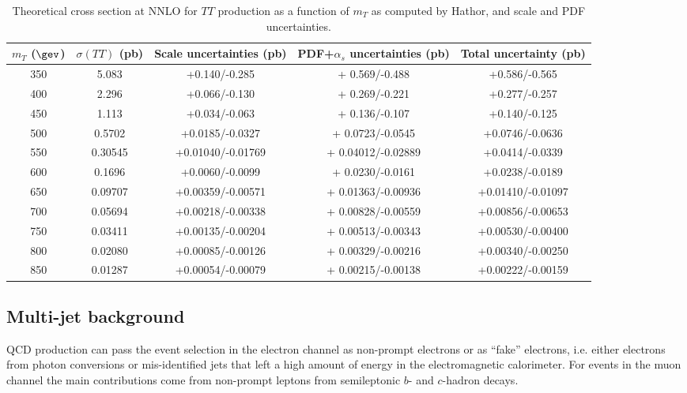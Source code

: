 \begin{table}[h!]
\begin{center}
\begin{tabular}{c c c c c}
\hline
\hline
 $m_{T}$ ($\gev$) & $\sigma(TT)$ (pb) & Scale uncertainties (pb) & PDF+$\alpha_s$ uncertainties (pb) & Total uncertainty (pb)\\
\hline
350 	&  5.083 		&  +0.140/-0.285 		&  + 0.569/-0.488 		&  +0.586/-0.565		\\
400 	&  2.296 		&  +0.066/-0.130 		&  + 0.269/-0.221 		&  +0.277/-0.257		\\
450 	&  1.113 		&  +0.034/-0.063 		&  + 0.136/-0.107 		&  +0.140/-0.125		\\
500 	&  0.5702 		&  +0.0185/-0.0327 		&  + 0.0723/-0.0545	 	&  +0.0746/-0.0636		\\
550 	&  0.30545 	&  +0.01040/-0.01769 	&  + 0.04012/-0.02889 	&  +0.0414/-0.0339		\\
600 	&  0.1696 		&  +0.0060/-0.0099 		&  + 0.0230/-0.0161	 	&  +0.0238/-0.0189		\\	
650 	&  0.09707 	&  +0.00359/-0.00571 	&  + 0.01363/-0.00936 	&  +0.01410/-0.01097	\\
700 	&  0.05694 	&  +0.00218/-0.00338 	&  + 0.00828/-0.00559 	&  +0.00856/-0.00653	\\
750 	&  0.03411 	&  +0.00135/-0.00204 	&  + 0.00513/-0.00343 	&  +0.00530/-0.00400	\\
800 	&  0.02080 	&  +0.00085/-0.00126 	&  + 0.00329/-0.00216 	&  +0.00340/-0.00250	\\
850 	&  0.01287 	&  +0.00054/-0.00079 	&  + 0.00215/-0.00138 	&  +0.00222/-0.00159 	\\
\hline
\hline
\end{tabular}
\caption{\label{tab:sigmaTT} Theoretical cross section at NNLO  for $TT$ production as a function
of $m_{T}$ as computed by {\sc Hathor}, and scale and PDF uncertainties.}
\end{center}
\end{table}

\subsection{Multi-jet background}\label{sec:qcdbkg}

QCD production can pass the event selection in the electron
channel as non-prompt electrons or as ``fake'' electrons, i.e.
either electrons from photon conversions or mis-identified jets
that left a high amount of energy in the electromagnetic calorimeter.
For events in the muon channel the main contributions come from
non-prompt leptons from semileptonic $b$- and $c$-hadron decays.


